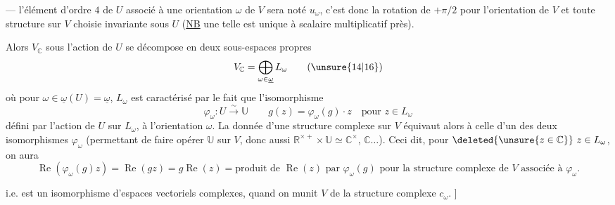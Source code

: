 --- l'élément d'ordre $4$ de $U$ associé à une orientation $\omega$ de  $V$\inserted{)} sera noté $u_\omega$, c'est donc la rotation de $+\pi/2$ pour l'orientation \inserted{$\omega$} de $V$ et toute structure  sur $V$ choisie invariante sous $U$ (\uline{NB}  une telle  est unique à scalaire multiplicatif près).

Alors $V_{\mathbb C}$ sous l'action de $U$ se décompose en deux sous-espaces propres
\begin{equation}
V_{\mathbb C}=\bigoplus_{\omega\in\underline\omega}L_\omega
\tag{\unsure{14|16}}
\end{equation}
où pour $\omega\in\underline\omega(U)=\underline\omega$, $L_\omega$ est caractérisé par le fait que l'isomorphisme
\begin{equation}
\varphi_\omega:U\xrightarrow{\sim}\mathbb U
\qquad
g(z)=\varphi_\omega(g)\cdot z\quad\text{pour }z\in L_\omega
\tag{15}
\end{equation}
défini par l'action de $U$ sur $L_\omega$,  à l'orientation $\omega$. La donnée d'une structure complexe sur $V$  équivaut alors à celle d'un des deux isomorphismes $\varphi_\omega$ (permettant de faire opérer $\mathbb U$ sur $V$, donc aussi $\mathbb R^{\times+}\times\mathbb U\simeq\mathbb C^\times$,  $\mathbb C\ldots$). Ceci dit, pour $\deleted{\unsure{z\in\mathbb C}}\ z\in L_\omega$, on aura
\[
\operatorname{Re}(\varphi_\omega(g)z)=\operatorname{Re}(gz)=g\operatorname{Re}(z)
=\text{produit de }\operatorname{Re}(z)\text{ par }\varphi_\omega(g)
\text{ pour la structure complexe de }V\text{ associée à }\varphi_\omega.
\]

i.e.
est un isomorphisme d'espaces vectoriels complexes, quand on munit $V$ de la structure complexe $c_\omega$. ]


